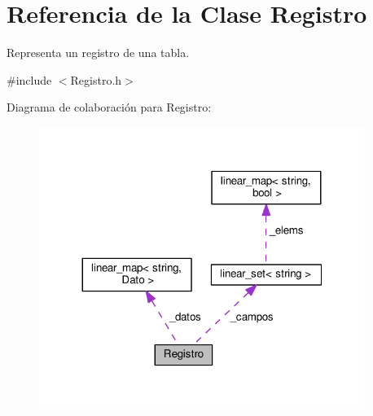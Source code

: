 \hypertarget{classRegistro}{\section{Referencia de la Clase Registro}
\label{classRegistro}
}


Representa un registro de una tabla.  




{\ttfamily \#include $<$Registro.\-h$>$}



Diagrama de colaboración para Registro\-:\nopagebreak
\begin{figure}[H]
\begin{center}
\leavevmode
\includegraphics[width=299pt]{classRegistro__coll__graph}
\end{center}
\end{figure}
